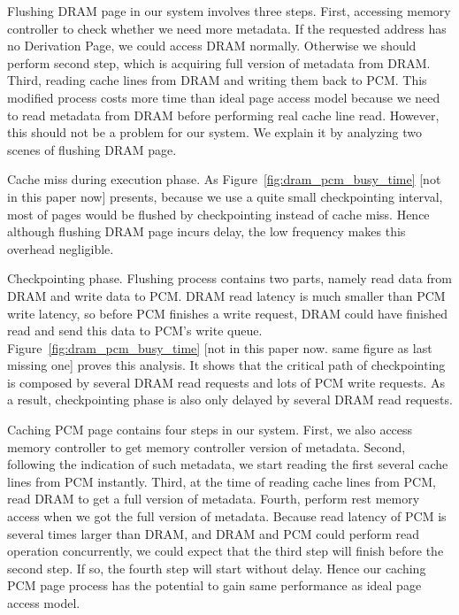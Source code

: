 \documentclass[conference]{IEEEtran}
\begin{document}
Flushing DRAM page in our system involves three steps.
First, accessing memory controller to check whether we need more metadata.
If the requested address has no Derivation Page, we could access DRAM normally.
Otherwise we should perform second step, which is acquiring full version of metadata from DRAM\@.
Third, reading cache lines from DRAM and writing them back to PCM\@.
This modified process costs more time than ideal page access model because we need to read metadata from DRAM before performing real cache line read.
However, this should not be a problem for our system.
We explain it by analyzing two scenes of flushing DRAM page.
\begin{enumerate*}
    \item Cache miss during execution phase.
        As Figure~\ref{fig:dram_pcm_busy_time} [not in this paper now] presents, because we use a quite small checkpointing interval, most of pages would be flushed by checkpointing instead of cache miss.
        Hence although flushing DRAM page incurs delay, the low frequency makes this overhead negligible.
    \item Checkpointing phase.
        Flushing process contains two parts, namely read data from DRAM and write data to PCM\@.
        DRAM read latency is much smaller than PCM write latency, so before PCM finishes a write request, DRAM could have finished read and send this data to PCM's write queue.
        Figure~\ref{fig:dram_pcm_busy_time} [not in this paper now. same figure as last missing one] proves this analysis.
        It shows that the critical path of checkpointing is composed by several DRAM read requests and lots of PCM write requests.
        As a result, checkpointing phase is also only delayed by several DRAM read requests.
\end{enumerate*}

Caching PCM page contains four steps in our system.
First, we also access memory controller to get memory controller version of metadata.
Second, following the indication of such metadata, we start reading the first several cache lines from PCM instantly.
Third, at the time of reading cache lines from PCM, read DRAM to get a full version of metadata.
Fourth, perform rest memory access when we got the full version of metadata.
Because read latency of PCM is several times larger than DRAM, and DRAM and PCM could perform read operation concurrently, we could expect that the third step will finish before the second step.
If so, the fourth step will start without delay.
Hence our caching PCM page process has the potential to gain same performance as ideal page access model.
\end{document}
